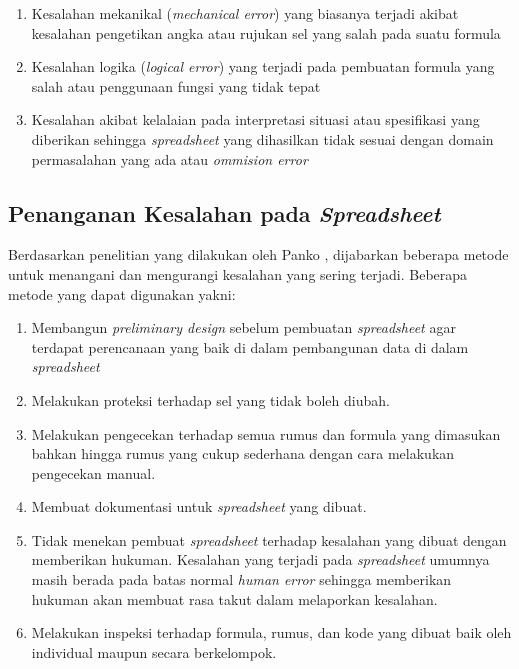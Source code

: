     \begin{enumerate}
        \item Kesalahan mekanikal (\textit{mechanical error}) yang biasanya terjadi akibat kesalahan pengetikan angka atau rujukan sel yang salah pada suatu formula
        \item Kesalahan logika (\textit{logical error}) yang terjadi pada pembuatan formula yang salah atau penggunaan fungsi yang tidak tepat
        \item Kesalahan akibat kelalaian pada interpretasi situasi atau spesifikasi yang diberikan sehingga \textit{spreadsheet} yang dihasilkan tidak sesuai dengan domain permasalahan yang ada atau \textit{ommision error} \parencite{Powell2009}
    \end{enumerate}

\subsection{Penanganan Kesalahan pada \textit{Spreadsheet}}
Berdasarkan penelitian yang dilakukan oleh Panko \parencite{Panko1998}, dijabarkan beberapa metode untuk menangani dan mengurangi kesalahan yang sering terjadi. Beberapa metode yang dapat digunakan yakni:

    \begin{enumerate}
        \item Membangun \textit{preliminary design} sebelum pembuatan \textit{spreadsheet} agar terdapat perencanaan yang baik di dalam pembangunan data di dalam \textit{spreadsheet}
        \item Melakukan proteksi terhadap sel yang tidak boleh diubah.
        \item Melakukan pengecekan terhadap semua rumus dan formula yang dimasukan bahkan hingga rumus yang cukup sederhana dengan cara melakukan pengecekan manual.
        \item Membuat dokumentasi untuk \textit{spreadsheet} yang dibuat.
        \item Tidak menekan pembuat \textit{spreadsheet} terhadap kesalahan yang dibuat dengan memberikan hukuman. Kesalahan yang terjadi pada \textit{spreadsheet} umumnya masih berada pada batas normal \textit{human error} sehingga memberikan hukuman akan membuat rasa takut dalam melaporkan kesalahan.
        \item Melakukan inspeksi terhadap formula, rumus, dan kode yang dibuat baik oleh individual maupun secara berkelompok.
    \end{enumerate}

